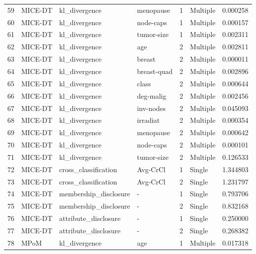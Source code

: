 \begin{tabular}{llllrlr}
59  &  MICE-DT &          kl\_divergence &    menopause &    1 &  Multiple &  0.000258 \\
60  &  MICE-DT &          kl\_divergence &    node-caps &    1 &  Multiple &  0.000157 \\
61  &  MICE-DT &          kl\_divergence &   tumor-size &    1 &  Multiple &  0.002311 \\
62  &  MICE-DT &          kl\_divergence &          age &    2 &  Multiple &  0.002811 \\
63  &  MICE-DT &          kl\_divergence &       breast &    2 &  Multiple &  0.000011 \\
64  &  MICE-DT &          kl\_divergence &  breast-quad &    2 &  Multiple &  0.002896 \\
65  &  MICE-DT &          kl\_divergence &        class &    2 &  Multiple &  0.000644 \\
66  &  MICE-DT &          kl\_divergence &    deg-malig &    2 &  Multiple &  0.002456 \\
67  &  MICE-DT &          kl\_divergence &    inv-nodes &    2 &  Multiple &  0.045093 \\
68  &  MICE-DT &          kl\_divergence &     irradiat &    2 &  Multiple &  0.000354 \\
69  &  MICE-DT &          kl\_divergence &    menopause &    2 &  Multiple &  0.000642 \\
70  &  MICE-DT &          kl\_divergence &    node-caps &    2 &  Multiple &  0.000101 \\
71  &  MICE-DT &          kl\_divergence &   tumor-size &    2 &  Multiple &  0.126533 \\
72  &  MICE-DT &   cross\_classification &     Avg-CrCl &    1 &    Single &  1.344803 \\
73  &  MICE-DT &   cross\_classification &     Avg-CrCl &    2 &    Single &  1.231797 \\
74  &  MICE-DT &  membership\_disclosure &            - &    1 &    Single &  0.793706 \\
75  &  MICE-DT &  membership\_disclosure &            - &    2 &    Single &  0.832168 \\
76  &  MICE-DT &   attribute\_disclosure &            - &    1 &    Single &  0.250000 \\
77  &  MICE-DT &   attribute\_disclosure &            - &    2 &    Single &  0.268382 \\
78  &     MPoM &          kl\_divergence &          age &    1 &  Multiple &  0.017318 \\

\end{tabular}
